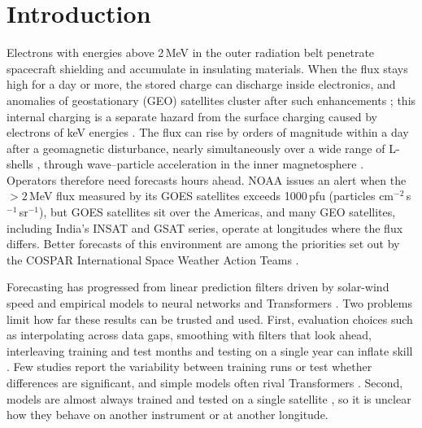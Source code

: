 \documentclass[a4paper,fleqn]{cas-dc}
\begin{document}
\maketitle

\section{Introduction}
\label{sec:intro}
Electrons with energies above 2\,MeV in the outer radiation belt penetrate spacecraft shielding and
accumulate in insulating materials. When the flux stays high for a day or more, the stored charge can
discharge inside electronics, and anomalies of geostationary (GEO) satellites cluster after such
enhancements \citep{wu2000,pilipenko2006,baker2018}; this internal charging is a separate hazard from the surface
charging caused by electrons of keV energies \citep{minow2024}. The flux can rise by orders of magnitude within a day
after a geomagnetic disturbance, nearly simultaneously over a wide range of L-shells \citep{kanekal2000}, through
wave--particle acceleration in the inner magnetosphere \citep{horne2005}. Operators
therefore need forecasts hours ahead. NOAA issues an alert when the \(>2\)\,MeV flux measured by its GOES
satellites exceeds 1000\,pfu (particles cm\(^{-2}\)\,s\(^{-1}\)\,sr\(^{-1}\)), but GOES satellites sit over the
Americas, and many GEO satellites, including India's INSAT and GSAT series, operate at longitudes where the flux
differs. Better forecasts of this environment are among the priorities set out by the COSPAR International Space
Weather Action Teams \citep{zheng2024}.

Forecasting has progressed from linear prediction filters driven by solar-wind speed \citep{baker1990} and
empirical models \citep{perry2010} to neural networks \citep{rodgers2003,wei2018,son2022} and Transformers
\citep{tan2024,sun2024,sun2025}. Two problems limit how far these results can be trusted and used. First,
evaluation choices such as interpolating across data gaps, smoothing with filters that look ahead,
interleaving training and test months and testing on a single year can inflate skill
\citep{camporeale2019,kapoor2023}. Few studies report the variability between training runs or test whether
differences are significant, and simple models often rival Transformers \citep{zeng2023,tan2024}. Second,
models are almost always trained and tested on a single satellite \citep{zhao2025}, so it is unclear how they
behave on another instrument or at another longitude.
\end{document}
